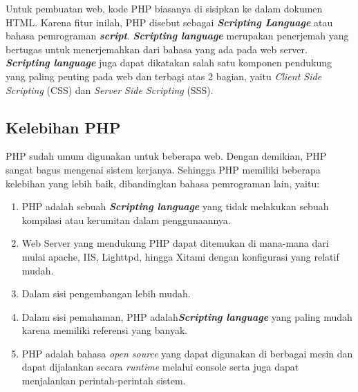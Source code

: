 	Untuk pembuatan web, kode PHP biasanya di sisipkan ke dalam dokumen HTML. Karena fitur inilah, PHP disebut sebagai \textit{\textbf{Scripting Language}} atau bahasa pemrograman \textbf{\textit{script}}. \textit{\textbf{Scripting language}} merupakan penerjemah yang bertugas untuk menerjemahkan dari bahasa yang ada pada web server. \textit{\textbf{Scripting language}} juga dapat dikatakan salah satu komponen pendukung yang paling penting pada web dan terbagi atas 2 bagian, yaitu \textit{Client Side Scripting} (CSS) dan \textit{Server Side Scripting} (SSS).

\subsection{Kelebihan PHP}
\label{sec:contohphp}

PHP sudah umum digunakan untuk beberapa web. Dengan demikian, PHP sangat bagus mengenai sistem kerjanya. Sehingga PHP memiliki beberapa kelebihan yang lebih baik, dibandingkan bahasa pemrograman lain, yaitu:
\begin{enumerate}
	\item PHP adalah sebuah \textit{\textbf{Scripting language}} yang tidak melakukan sebuah kompilasi atau kerumitan dalam penggunaannya.
	\item Web Server yang mendukung PHP dapat ditemukan di mana-mana dari mulai apache, IIS, Lighttpd, hingga Xitami dengan konfigurasi yang relatif mudah.
	\item Dalam sisi pengembangan lebih mudah.
	\item Dalam sisi pemahaman, PHP adalah\textit{\textbf{Scripting language}} yang paling mudah karena memiliki referensi yang banyak.
	\item PHP adalah bahasa \textit{open source} yang dapat digunakan di berbagai mesin dan dapat dijalankan secara \textit{runtime} melalui console serta juga dapat menjalankan perintah-perintah sistem.
\end{enumerate}


